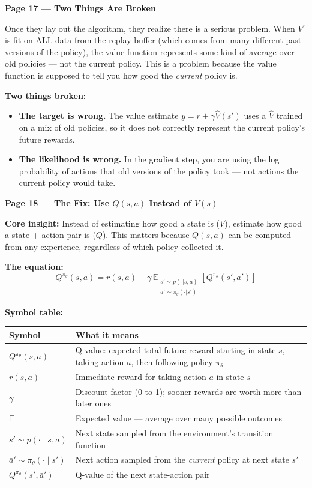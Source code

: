 \bigskip

\textbf{Page 17 --- Two Things Are Broken}

\medskip
Once they lay out the algorithm, they realize there is a serious problem.
When $V^{\pi}$ is fit on ALL data from the replay buffer (which comes from many
different past versions of the policy), the value function represents some kind
of average over old policies --- not the current policy. This is a problem
because the value function is supposed to tell you how good the \textit{current}
policy is.

\medskip
\textbf{Two things broken:}
\begin{itemize}
    \item \textbf{The target is wrong.} The value estimate $y = r + \gamma \hat{V}(s')$
          uses a $\hat{V}$ trained on a mix of old policies, so it does not correctly
          represent the current policy's future rewards.
    \item \textbf{The likelihood is wrong.} In the gradient step, you are using the
          log probability of actions that old versions of the policy took --- not
          actions the current policy would take.
\end{itemize}

\bigskip

\textbf{Page 18 --- The Fix: Use $Q(s, a)$ Instead of $V(s)$}

\medskip
\textbf{Core insight:} Instead of estimating how good a state is ($V$), estimate
how good a state + action pair is ($Q$). This matters because $Q(s, a)$ can be
computed from any experience, regardless of which policy collected it.

\medskip
\textbf{The equation:}
\[
    Q^{\pi_\theta}(s, a)
    = r(s, a)
    + \gamma \,
      \mathbb{E}_{\substack{s' \sim p(\cdot|s,a) \\ \bar{a}' \sim \pi_\theta(\cdot|s')}}
      \!\left[ Q^{\pi_\theta}(s', \bar{a}') \right]
\]

\medskip
\textbf{Symbol table:}

\begin{tabular}{p{5.5cm} p{8.5cm}}
\hline
\textbf{Symbol} & \textbf{What it means} \\
\hline
$Q^{\pi_\theta}(s, a)$ & Q-value: expected total future reward starting in state $s$, taking action $a$, then following policy $\pi_\theta$ \\[4pt]
$r(s, a)$ & Immediate reward for taking action $a$ in state $s$ \\[4pt]
$\gamma$ & Discount factor (0 to 1); sooner rewards are worth more than later ones \\[4pt]
$\mathbb{E}$ & Expected value --- average over many possible outcomes \\[4pt]
$s' \sim p(\cdot \mid s, a)$ & Next state sampled from the environment's transition function \\[4pt]
$\bar{a}' \sim \pi_\theta(\cdot \mid s')$ & Next action sampled from the \textit{current} policy at next state $s'$ \\[4pt]
$Q^{\pi_\theta}(s', \bar{a}')$ & Q-value of the next state-action pair \\
\hline
\end{tabular}

